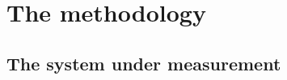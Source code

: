 \documentclass{acmsig}
\begin{document}


\section{The methodology}

\subsection{The system under measurement}
\end{document}
